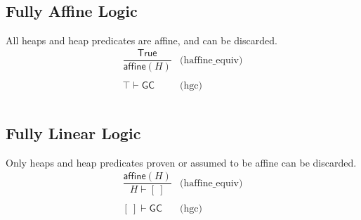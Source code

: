 \documentclass[10pt,a4paper]{article}
\newcommand{\emp}{[\: ]} %
\newcommand{\himpl}{\vdash}
\newcommand{\haffine}[1]{\mathsf{affine}(#1)}
\newcommand{\hgc}{\mathsf{GC}} %
\begin{document}
\begin{multicols}{2}
\[\begin{array}{cl}
\end{array}
\]

\subsection*{Fully Affine Logic}
All heaps and heap predicates are affine, and can be discarded. 
\[
  \begin{array}{cl}
    \dfrac{\mathsf{True}}
    { \haffine{H} } & \text{(haffine\_equiv)} \\
    \\
        
    
    {\top}
    \himpl
    {\hgc} & \text{(hgc)} \\
  \\
  \end{array}
\]

\subsection*{Fully Linear Logic}
Only heaps and heap predicates proven or assumed to be affine can be discarded.
\[
\begin{array}{cl}
  \dfrac{\haffine{H}}
  {H \himpl \emp} & \text{(haffine\_equiv)} \\
\\
        
    
  {\emp}
  \himpl
   {\hgc} & \text{(hgc)} \\
  \\  
\end{array}
\]


\end{multicols}
\end{document}
